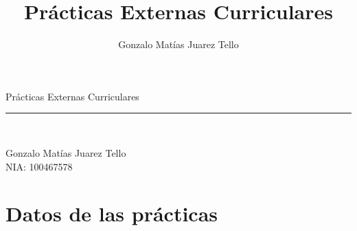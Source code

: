 \documentclass[12pt]{extreport} %
\title{Prácticas Externas Curriculares}
\author{Gonzalo Matías Juarez Tello}
\date{}
\begin{document}
\begin{titlepage}
	\begin{sffamily}
	\color{azulUC3M}
	\begin{center}
		\begin{figure}[H] %
		\end{figure}
		\vspace{2.5cm}
		{\Huge Prácticas Externas Curriculares}\\
		\vspace*{0.5cm}
	 	\rule{10.5cm}{0.1mm}\\
		\vspace*{1cm}
		\begin{Large}
		  Gonzalo Matías Juarez Tello\\
                  NIA: 100467578\\
		\end{Large}
	\end{center}
	\vfill
	\color{black}
	\end{sffamily}
\end{titlepage}

\setcounter{page}{2}
\tableofcontents
\thispagestyle{fancy}
\thispagestyle{empty}
\mbox{}

\chapter*{Datos de las prácticas}
\end{document}
